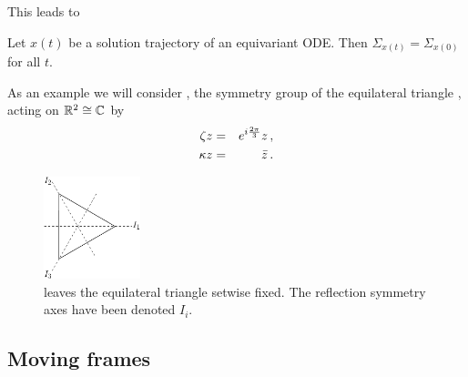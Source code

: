 This leads to 
\begin{proposition}
 Let $x(t)$ be a solution trajectory of an equivariant ODE. Then $\Sigma_{x(t)}=\Sigma_{x(0)}$ for all $t$.
\end{proposition}

As an example we will consider , the symmetry group of the equilateral triangle , acting on $\mathbb{R}^{2}\cong\mathbb{C}^{}$ by
\begin{eqnarray*}
  \zeta z &=& e^{i\frac{2\pi}{3}} z\,,\\
  \kappa z  &=& \bar{z}\,.
\end{eqnarray*}

\begin{figure}
\begin{center}
		\includegraphics[width=0.25\textwidth]{figs/D3triangle}
\end{center}
\caption[D3 symmetry illustration.]{
    {\small
     leaves the equilateral triangle setwise fixed. The reflection symmetry axes have been denoted $I_i$.}}
\label{fig:D3triangle}
    \vspace*{-5pt}
\end{figure}




\subsection{Moving frames}

